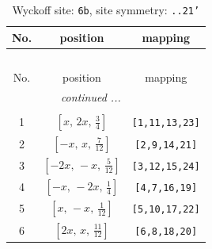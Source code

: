 \documentclass[fleqn,8pt]{jsarticle}
\begin{document}
\begin{longtable}{ccc}
\caption{Wyckoff site: {\tt 6b}, site symmetry: {\tt ..21'}}
 \\
 \hline \hline
No. & position & mapping \\ \hline \endfirsthead

\multicolumn{2}{l}{\tablename\ \thetable{}} \\
 \hline \hline
No. & position & mapping \\ \hline \endhead

 \hline \hline
\multicolumn{2}{r}{\footnotesize\it continued ...} \\ \endfoot

 \hline \hline
\multicolumn{2}{r}{} \\ \endlastfoot

1 & $\left[ x,\, 2 x,\, \frac{3}{4} \right]$ & {\tt [1,11,13,23]} \\ \hline
2 & $\left[ - x,\, x,\, \frac{7}{12} \right]$ & {\tt [2,9,14,21]} \\ \hline
3 & $\left[ - 2 x,\, - x,\, \frac{5}{12} \right]$ & {\tt [3,12,15,24]} \\ \hline
4 & $\left[ - x,\, - 2 x,\, \frac{1}{4} \right]$ & {\tt [4,7,16,19]} \\ \hline
5 & $\left[ x,\, - x,\, \frac{1}{12} \right]$ & {\tt [5,10,17,22]} \\ \hline
6 & $\left[ 2 x,\, x,\, \frac{11}{12} \right]$ & {\tt [6,8,18,20]} \\
\end{longtable}
\renewcommand{\arraystretch}{1.2}
\end{document}
